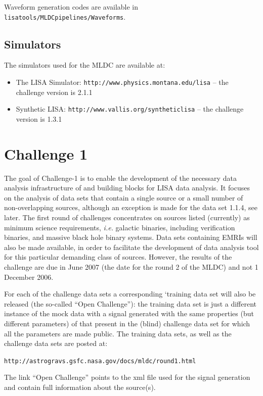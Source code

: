 \documentclass[11pt]{report}
\begin{document}
Waveform generation codes are available in {\tt lisatools/MLDCpipelines/Waveforms}.

\section{Simulators}

The simulators used for the MLDC are available at:

\begin{itemize}
\item The LISA Simulator: {\tt http://www.physics.montana.edu/lisa} -- the challenge version is 2.1.1
\item Synthetic LISA: {\tt http://www.vallis.org/syntheticlisa} -- the challenge version is 1.3.1
\end{itemize}


\chapter{Challenge 1}

The goal of Challenge-1 is to enable the development of the necessary data analysis infrastructure of and building blocks for LISA data analysis. It focuses on the analysis of data sets that contain a single source or a small number of non-overlapping sources, although an exception is made for the data set 1.1.4, see later. The first round of challenges concentrates on sources listed (currently) as minimum science requirements, {\em i.e.} galactic binaries, including verification binaries, and massive black hole binary systems. Data sets containing EMRIs will also be made available, in order to facilitate the development of data analysis tool for this particular demanding class of sources. However, the results of the challenge are due in June 2007 (the date for the round 2 of the MLDC) and not 1 December 2006.

For each of the challenge data sets a corresponding `training data set will also be released (the so-called ``Open Challenge''): the training data set is just a different instance of the mock data with a signal generated with the same properties (but different parameters) of that present in the (blind) challenge data set for which all the parameters are made public. The training data sets, as well as the challenge data sets are posted at:

{\tt http://astrogravs.gsfc.nasa.gov/docs/mldc/round1.html}

The link ``Open Challenge'' points to the xml file used for the signal generation and contain full information about the source(s).
\end{document}
